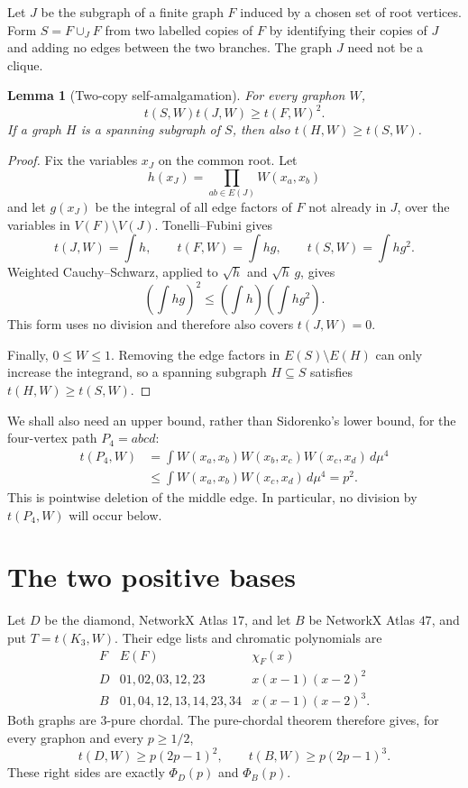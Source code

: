 \documentclass[11pt]{article}
\newtheorem{lemma}[theorem]{Lemma}
\begin{document}
Let $J$ be the subgraph of a finite graph $F$ induced by a chosen set of
root vertices.  Form $S=F\cup_JF$ from two labelled copies of $F$ by
identifying their copies of $J$ and adding no edges between the two
branches.  The graph $J$ need not be a clique.

\begin{lemma}[Two-copy self-amalgamation]\label{lem:amalgam}
For every graphon $W$,
\[
 t(S,W)t(J,W)\geq t(F,W)^2.
\]
If a graph $H$ is a spanning subgraph of $S$, then also
$t(H,W)\geq t(S,W)$.
\end{lemma}

\begin{proof}
Fix the variables $x_J$ on the common root.  Let
\[
 h(x_J)=\prod_{ab\in E(J)}W(x_a,x_b)
\]
and let $g(x_J)$ be the integral of all edge factors of $F$ not already
in $J$, over the variables in $V(F)\setminus V(J)$.  Tonelli--Fubini
gives
\[
 t(J,W)=\int h,
 \qquad
 t(F,W)=\int hg,
 \qquad
 t(S,W)=\int hg^2.
\]
Weighted Cauchy--Schwarz, applied to $\sqrt h$ and $\sqrt h\,g$, gives
\[
 \left(\int hg\right)^2
 \leq\left(\int h\right)\left(\int hg^2\right).
\]
This form uses no division and therefore also covers $t(J,W)=0$.

Finally, $0\leq W\leq1$.  Removing the edge factors in
$E(S)\setminus E(H)$ can only increase the integrand, so a spanning
subgraph $H\subseteq S$ satisfies $t(H,W)\geq t(S,W)$.
\end{proof}

We shall also need an upper bound, rather than Sidorenko's lower bound,
for the four-vertex path $P_4=abcd$:
\begin{equation}\label{eq:p4-upper}
\begin{split}
 t(P_4,W)
 &=\int W(x_a,x_b)W(x_b,x_c)W(x_c,x_d)\,d\mu^4\\
 &\leq\int W(x_a,x_b)W(x_c,x_d)\,d\mu^4=p^2.
\end{split}
\end{equation}
This is pointwise deletion of the middle edge.  In particular, no
division by $t(P_4,W)$ will occur below.

\section{The two positive bases}

Let $D$ be the diamond, NetworkX Atlas $17$, and let $B$ be NetworkX
Atlas $47$, and put $T=t(K_3,W)$.  Their edge lists and chromatic
polynomials are
\[
\begin{array}{c|l|l}
F&E(F)&\chi_F(x)\\ \hline
D&01,02,03,12,23&x(x-1)(x-2)^2\\
B&01,04,12,13,14,23,34&x(x-1)(x-2)^3.
\end{array}
\]
Both graphs are $3$-pure chordal.  The pure-chordal theorem therefore
gives, for every graphon and every $p\geq1/2$,
\begin{equation}\label{eq:base-bounds}
 t(D,W)\geq p(2p-1)^2,
 \qquad
 t(B,W)\geq p(2p-1)^3.
\end{equation}
These right sides are exactly $\Phi_D(p)$ and $\Phi_B(p)$.
\end{document}
